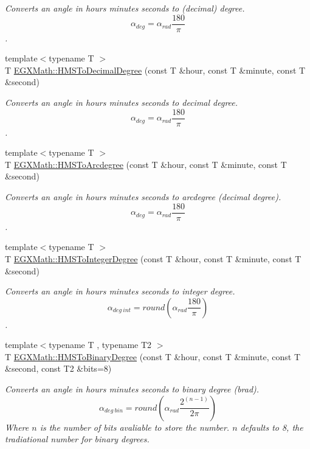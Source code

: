 \begin{DoxyCompactItemize}
\begin{DoxyCompactList}\small\item\em Converts an angle in hours minutes seconds to (decimal) degree. \[\alpha_{deg}=\alpha_{rad}\frac{180}{\pi}\]. \end{DoxyCompactList}\item 
{\footnotesize template$<$typename T $>$ }\\T \mbox{\hyperlink{group___e_g_x_math-_angle_conversions-_h_m_s_gacc6ae7123e7e54ddf8538cd6ab0198ce}{E\+G\+X\+Math\+::\+H\+M\+S\+To\+Decimal\+Degree}} (const T \&hour, const T \&minute, const T \&second)
\begin{DoxyCompactList}\small\item\em Converts an angle in hours minutes seconds to decimal degree. \[\alpha_{deg}=\alpha_{rad}\frac{180}{\pi}\]. \end{DoxyCompactList}\item 
{\footnotesize template$<$typename T $>$ }\\T \mbox{\hyperlink{group___e_g_x_math-_angle_conversions-_h_m_s_gaf4a94d34cb0629049bbcab8775d2af43}{E\+G\+X\+Math\+::\+H\+M\+S\+To\+Arcdegree}} (const T \&hour, const T \&minute, const T \&second)
\begin{DoxyCompactList}\small\item\em Converts an angle in hours minutes seconds to arcdegree (decimal degree). \[\alpha_{deg}=\alpha_{rad}\frac{180}{\pi}\]. \end{DoxyCompactList}\item 
{\footnotesize template$<$typename T $>$ }\\T \mbox{\hyperlink{group___e_g_x_math-_angle_conversions-_h_m_s_ga5091437050cc32e29f722a3c50650405}{E\+G\+X\+Math\+::\+H\+M\+S\+To\+Integer\+Degree}} (const T \&hour, const T \&minute, const T \&second)
\begin{DoxyCompactList}\small\item\em Converts an angle in hours minutes seconds to integer degree. \[\alpha_{deg\ int}=round(\alpha_{rad}\frac{180}{\pi})\]. \end{DoxyCompactList}\item 
{\footnotesize template$<$typename T , typename T2 $>$ }\\T \mbox{\hyperlink{group___e_g_x_math-_angle_conversions-_h_m_s_gaa8a439d695e8aa75828eeab412a489ca}{E\+G\+X\+Math\+::\+H\+M\+S\+To\+Binary\+Degree}} (const T \&hour, const T \&minute, const T \&second, const T2 \&bits=8)
\begin{DoxyCompactList}\small\item\em Converts an angle in hours minutes seconds to binary degree (brad). \[\alpha_{deg\ bin}=round(\alpha_{rad}\frac{2^{(n-1)}}{2 \pi})\] Where $n$ is the number of bits avaliable to store the number. $n$ defaults to 8, the tradiational number for binary degrees. \end{DoxyCompactList}\item 

\end{DoxyCompactItemize}
